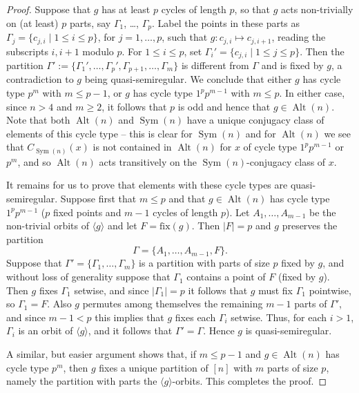 \documentclass{article}
\theoremstyle{remark}
\theoremstyle{definition}
\DeclareMathOperator{\Alt}{Alt}
\DeclareMathOperator{\Sym}{Sym}
\newcommand{\qsr}{quasi-semiregular}
\begin{document}
\begin{proof}
Suppose that $g$ has at least $p$ cycles of length $p$, so that $g$ acts non-trivially on (at least) $p$ parts, say  $\Gamma_1$, \ldots, $\Gamma_p$. Label the points in these parts as $\Gamma_j = \{c_{j,i}\mid 1\leqslant i\leqslant p\}$, for $j=1,\dots, p$, such that $g : c_{j,i} \mapsto c_{j,i+1}$, reading the subscripts $i, i+1$ modulo $p$. For $1\leqslant i \leqslant p$, set $\Gamma_i'=\{c_{j,i} \mid 1\leqslant j \leqslant p\}$. Then the partition $\Gamma':=\{ \Gamma_1',\dots,\Gamma_p',\Gamma_{p+1},\dots, \Gamma_m\}$  is different from $\Gamma$ and is fixed by $g$, a contradiction to $g$ being {\qsr}. We conclude that either $g$ has cycle type $p^m$ with $m\leqslant p-1$, or  $g$ has cycle type $1^pp^{m-1}$ with $m\leqslant p$. In either case, since $n>4$ and $m\geqslant2$, it follows that $p$ is odd and hence that $g\in\Alt(n)$.  Note that both $\Alt(n)$ and $\Sym(n)$ have a unique conjugacy class of elements of this cycle type -- this is clear for $\Sym(n)$ and for $\Alt(n)$ we see that $C_{\Sym(n)}(x)$ is not contained in $\Alt(n)$ for $x$ of cycle type $1^pp^{m-1}$ or $p^m$, and so $\Alt(n)$ acts transitively on the $\Sym(n)$-conjugacy class of $x$.


It remains for us to prove that elements with these cycle types are {\qsr}. Suppose first that $m \leqslant p$ and that $g \in \Alt(n)$ has cycle type $1^pp^{m-1}$ ($p$ fixed points and $m-1$ cycles of length $p$). Let $A_1,\ldots,A_{m-1}$   be the non-trivial orbits of $\langle g\rangle $ and let $F=\mathrm{fix}(g)$. Then $|F|=p$ and  $g$ preserves the partition 
$$
\Gamma=\{A_1,\ldots,A_{m-1}, F\}.
$$
Suppose that $\Gamma'=\{\Gamma_1,\ldots,\Gamma_m\}$ is a partition with parts of size $p$ fixed by $g$, and without loss of generality suppose that $\Gamma_1$ contains a point of $F$ (fixed by $g$). Then $g$ fixes $\Gamma_1$ setwise, and since $|\Gamma_1|=p$ it follows that $g$ must fix $\Gamma_1$ pointwise, so $\Gamma_1=F$. Also $g$ permutes among themselves the remaining $m-1$ parts of $\Gamma'$, and since $m-1<p$ this implies that $g$ fixes each $\Gamma_i$ setwise. Thus, for each $i>1$, $\Gamma_i$ is an orbit of $\langle g\rangle$, and it follows that $\Gamma'=\Gamma$. Hence $g$ is {\qsr}.

A similar, but easier argument shows that, if $m\leqslant p-1$ and  $g \in \Alt(n)$ has cycle type $p^{m}$, then $g$ fixes a unique partition of $[n]$ with $m$ parts of size $p$, namely the partition with parts the $\langle g\rangle$-orbits.  This completes the proof.
\end{proof}
\end{document}
